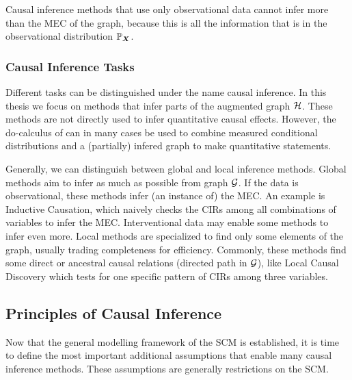 Causal inference methods that use only observational data cannot infer more than the MEC of the graph, because this is all the information that is in the observational distribution $\mathbb{P}_{\bm{X}}$.


\subsubsection{Causal Inference Tasks}
Different tasks can be distinguished under the name causal inference. In this thesis we focus on methods that infer parts of the augmented graph $\mathcal{H}$. These methods are not directly used to infer quantitative causal effects. However, the do-calculus of \citet{pearl2009causality} can in many cases be used to combine measured conditional distributions and a (partially) infered graph to make quantitative statements.

Generally, we can distinguish between global and local inference methods. Global methods aim to infer as much as possible from graph $\mathcal{G}$. If the data is observational, these methods infer (an instance of) the MEC. An example is Inductive Causation, which naively checks the CIRs among all combinations of variables to infer the MEC. Interventional data may enable some methods to infer even more. Local methods are specialized to find only some elements of the graph, usually trading completeness for efficiency. Commonly, these methods find some direct or ancestral causal relations (directed path in $\mathcal{G}$), like Local Causal Discovery which tests for one specific pattern of CIRs among three variables.


\subsection{Principles of Causal Inference}
\label{sec:back:prin}

Now that the general modelling framework of the SCM is established, it is time to define the most important additional assumptions that enable many causal inference methods. These assumptions are generally restrictions on the SCM.






\label{sec:back:meth}